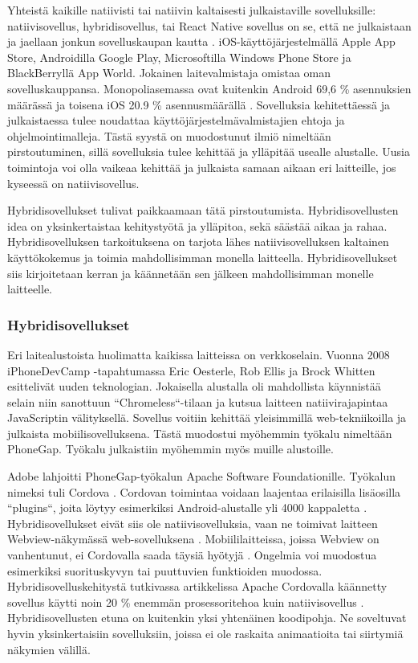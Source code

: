 \documentclass{tktltiki}
\begin{document}
Yhteistä kaikille natiivisti tai natiivin kaltaisesti julkaistaville sovelluksille: natiivisovellus, hybridisovellus, tai React Native sovellus on se, että ne julkaistaan ja jaellaan jonkun sovelluskaupan kautta \cite{xanthopoulos2013comparative}. iOS-käyttöjärjestelmällä Apple App Store, Androidilla Google Play, Microsoftilla Windows Phone Store ja BlackBerryllä App World. Jokainen laitevalmistaja omistaa oman sovelluskauppansa. Monopoliasemassa ovat kuitenkin Android 69,6 \% asennuksien määrässä ja toisena iOS 20.9 \% asennusmäärällä \cite{xanthopoulos2013comparative}. Sovelluksia kehitettäessä ja julkaistaessa tulee noudattaa käyttöjärjestelmävalmistajien ehtoja ja ohjelmointimalleja. Tästä syystä on muodostunut ilmiö nimeltään pirstoutuminen, sillä sovelluksia tulee kehittää ja ylläpitää usealle alustalle. Uusia toimintoja voi olla vaikeaa kehittää ja julkaista samaan aikaan eri laitteille, jos kyseessä on natiivisovellus.

Hybridisovellukset tulivat paikkaamaan tätä pirstoutumista. Hybridisovellusten idea on yksinkertaistaa kehitystyötä ja ylläpitoa, sekä säästää aikaa ja rahaa. Hybridisovelluksen tarkoituksena on tarjota lähes natiivisovelluksen kaltainen käyttökokemus ja toimia mahdollisimman monella laitteella. Hybridisovellukset siis kirjoitetaan kerran ja käännetään sen jälkeen mahdollisimman monelle laitteelle. 

\subsubsection{Hybridisovellukset}

Eri laitealustoista huolimatta kaikissa laitteissa on verkkoselain. Vuonna 2008 iPhoneDevCamp -tapahtumassa Eric Oesterle, Rob Ellis ja Brock Whitten \cite{charland2011mobile} esittelivät uuden teknologian. Jokaisella alustalla oli mahdollista käynnistää selain niin sanottuun “Chromeless“-tilaan ja kutsua laitteen natiivirajapintaa JavaScriptin välityksellä. Sovellus voitiin kehittää yleisimmillä web-tekniikoilla ja julkaista mobiilisovelluksena. Tästä muodostui myöhemmin työkalu nimeltään PhoneGap. Työkalu julkaistiin myöhemmin myös muille alustoille. 

Adobe lahjoitti PhoneGap-työkalun Apache Software Foundationille. Työkalun nimeksi tuli Cordova \cite{Tung}. Cordovan toimintaa voidaan laajentaa erilaisilla lisäosilla “plugins“, joita löytyy esimerkiksi Android-alustalle yli 4000 kappaletta \cite{Cordova}. Hybridisovellukset eivät siis ole natiivisovelluksia, vaan ne toimivat laitteen Webview-näkymässä web-sovelluksena \cite{bosnic2016development}. Mobiililaitteissa, joissa Webview on vanhentunut, ei Cordovalla saada täysiä hyötyjä \cite{bosnic2016development}. Ongelmia voi muodostua esimerkiksi suorituskyvyn tai puuttuvien funktioiden muodossa. Hybridisovelluskehitystä tutkivassa artikkelissa Apache Cordovalla käännetty sovellus käytti noin 20 \% enemmän prosessoritehoa kuin natiivisovellus \cite{bosnic2016development}. Hybridisovellusten etuna on kuitenkin yksi yhtenäinen koodipohja. Ne soveltuvat hyvin yksinkertaisiin sovelluksiin, joissa ei ole raskaita animaatioita tai siirtymiä näkymien välillä. 
\end{document}
